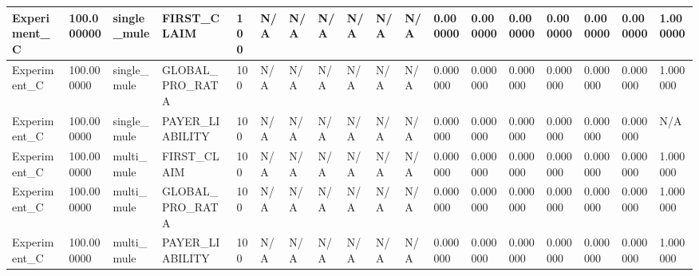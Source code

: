 \begin{tabular}{|l|l|l|l|l|l|l|l|l|l|l|l|l|l|l|l|l|l|}
Experiment\_C & 100.000000 & single\_mule & FIRST\_CLAIM & 100 & N/A & N/A & N/A & N/A & N/A & N/A & 0.000000 & 0.000000 & 0.000000 & 0.000000 & 0.000000 & 0.000000 & 1.000000 \\ \hline
Experiment\_C & 100.000000 & single\_mule & GLOBAL\_PRO\_RATA & 100 & N/A & N/A & N/A & N/A & N/A & N/A & 0.000000 & 0.000000 & 0.000000 & 0.000000 & 0.000000 & 0.000000 & 1.000000 \\ \hline
Experiment\_C & 100.000000 & single\_mule & PAYER\_LIABILITY & 100 & N/A & N/A & N/A & N/A & N/A & N/A & 0.000000 & 0.000000 & 0.000000 & 0.000000 & 0.000000 & 0.000000 & N/A \\ \hline
Experiment\_C & 100.000000 & multi\_mule & FIRST\_CLAIM & 100 & N/A & N/A & N/A & N/A & N/A & N/A & 0.000000 & 0.000000 & 0.000000 & 0.000000 & 0.000000 & 0.000000 & 1.000000 \\ \hline
Experiment\_C & 100.000000 & multi\_mule & GLOBAL\_PRO\_RATA & 100 & N/A & N/A & N/A & N/A & N/A & N/A & 0.000000 & 0.000000 & 0.000000 & 0.000000 & 0.000000 & 0.000000 & 1.000000 \\ \hline
Experiment\_C & 100.000000 & multi\_mule & PAYER\_LIABILITY & 100 & N/A & N/A & N/A & N/A & N/A & N/A & 0.000000 & 0.000000 & 0.000000 & 0.000000 & 0.000000 & 0.000000 & 1.000000 \\ \hline
\end{tabular}
